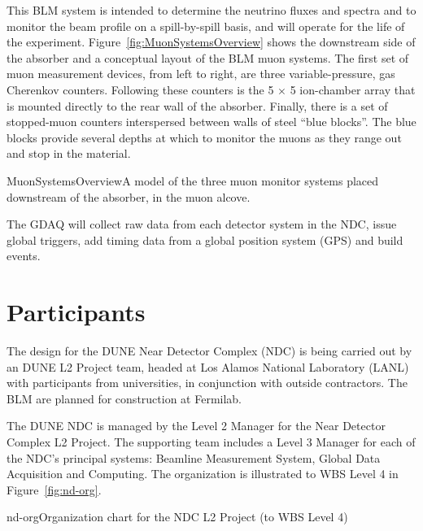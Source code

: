This BLM system is intended to determine the neutrino fluxes and spectra
and to monitor the beam profile on a spill-by-spill basis, and will operate for the life of the
experiment. 
Figure~\ref{fig:MuonSystemsOverview} shows the downstream side of the absorber and a conceptual 
layout of the BLM muon systems.
The first set 
of muon measurement devices, from  left to right, are three
variable-pressure, gas Cherenkov counters. Following these counters 
is the 5 $\times$ 5 ion-chamber array that is
 mounted directly to the rear wall of the absorber. 
Finally, there is a set of stopped-muon counters 
 interspersed between walls of steel ``blue blocks''. The blue blocks 
provide several
 depths at which to monitor the muons as they range out and stop 
in the material.

\begin{cdrfigure}{MuonSystemsOverview}{A model of the three muon monitor systems placed downstream of the absorber, in the muon alcove.}
\end{cdrfigure}

The GDAQ will collect raw data from each
detector system in the NDC, issue global triggers, add timing data
from a global position system (GPS) and build events.


\section{Participants}
\label{sec:nd-intro-participants}

The design for the DUNE Near Detector Complex (NDC) is being carried out by an DUNE L2 Project team, headed at Los Alamos National Laboratory (LANL) 
with participants from universities, in conjunction with outside contractors.  
The BLM are planned for construction at 
Fermilab.

The DUNE NDC is managed by the 
Level 2 Manager for the Near Detector Complex L2 Project. The supporting team 
includes a Level 3 
Manager for each of the NDC's principal systems: Beamline Measurement System, Global Data Acquisition and Computing. The organization is illustrated to WBS Level 4 in Figure~\ref{fig:nd-org}.

\begin{cdrfigure}{nd-org}{Organization chart for the NDC L2 Project (to WBS Level 4)}
\end{cdrfigure}

